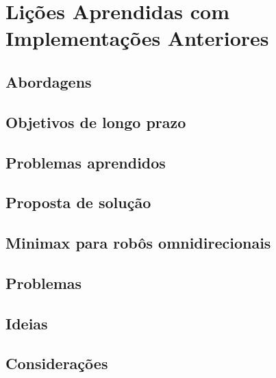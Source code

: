 \chapter{Lições Aprendidas com Implementações Anteriores}
\section{Abordagens}
\section{Objetivos de longo prazo}
\section{Problemas aprendidos}
\section{Proposta de solução}
\section{Minimax para robôs omnidirecionais}
\section{Problemas}
\section{Ideias}
\section{Considerações}
